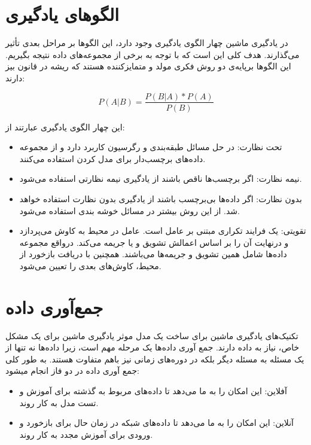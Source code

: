 \newpage

\section{الگوهای یادگیری}

در یادگیری ماشین چهار الگوی یادگیری وجود دارد، این الگوها بر مراحل بعدی تأثیر می‌گذارند. هدف کلی این است که با توجه به برخی از مجموعه‌های داده نتیجه بگیریم. این الگوها برپایه‌ی دو روش فکری مولد    و متمایزکننده  هستند که ریشه در قانون بیز   دارند:

\begin{equation}
    P(A|B) = \frac{P(B|A)*P(A)}{P(B)}
\end{equation}

این چهار الگوی یادگیری عبارتند از:
\begin{itemize}
\item تحت نظارت: در حل مسائل طبقه‌بندی و رگرسیون کاربرد دارد و از مجموعه داده‌های برچسب‌دار برای مدل کردن استفاده می‌کنند.
\item نیمه نظارت: اگر برچسب‌ها ناقص باشند از یادگیری نیمه نظارتی استفاده می‌شود.
\item بدون نظارت: اگر داده‌ها بی‌برچسب باشند از یادگیری بدون نظارت استفاده خواهد شد. از این روش بیشتر در مسائل خوشه بندی استفاده می‌شود.
\item تقویتی: یک فرایند تکراری مبتنی بر عامل است. عامل در محیط به کاوش می‌پردازد و درنهایت آن را بر اساس اعمالش تشویق و یا جریمه می‌کند. درواقع مجموعه داده‌ها شامل همین تشویق و جریمه‌ها می‌باشند. همچنین با دریافت بازخورد از محیط، کاوش‌های بعدی را تعیین می‌شود.
\end{itemize}



\newpage


\section{جمع‌آوری داده}

تکنیک‌های یادگیری ماشین برای ساخت یک مدل موثر یادگیری ماشین برای یک مشکل خاص، نیاز به داده دارند. جمع آوری داده‌ها یک مرحله مهم است، زیرا داده‌ها نه تنها از یک مسئله به مسئله دیگر بلکه در دوره‌های زمانی نیز باهم متفاوت هستند. به طور کلی جمع آوری داده در دو فاز انجام میشود:
\begin{itemize}
\item آفلاین: این امکان را به ما می‌دهد تا داده‌های مربوط به گذشته برای آموزش و تست مدل به کار روند.
\item آنلاین: این امکان را به ما می‌دهد تا داده‌های شبکه در زمان حال برای بازخورد و ورودی برای آموزش مجدد به کار روند.
\end{itemize}

